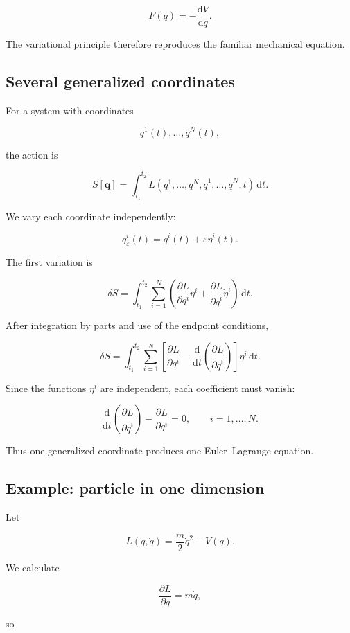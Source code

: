 \[
F(q)
=
-\frac{\mathrm{d}V}{\mathrm{d}q}.
\]

The variational principle therefore reproduces the familiar mechanical equation.

\subsection{Several generalized coordinates}

For a system with coordinates

\[
q^{1}(t),\ldots,q^{N}(t),
\]

the action is

\[
S[\mathbf{q}]
=
\int_{t_{1}}^{t_{2}}
L(q^{1},\ldots,q^{N},
\dot q^{1},\ldots,\dot q^{N},t)
\,\mathrm{d}t.
\]

We vary each coordinate independently:

\[
q^{i}_{\varepsilon}(t)
=
q^{i}(t)+\varepsilon\eta^{i}(t).
\]

The first variation is

\[
\delta S
=
\int_{t_{1}}^{t_{2}}
\sum_{i=1}^{N}
\left(
\frac{\partial L}{\partial q^{i}}\eta^{i}
+
\frac{\partial L}{\partial\dot q^{i}}\dot\eta^{i}
\right)
\,\mathrm{d}t.
\]

After integration by parts and use of the endpoint conditions,

\[
\delta S
=
\int_{t_{1}}^{t_{2}}
\sum_{i=1}^{N}
\left[
\frac{\partial L}{\partial q^{i}}
-
\frac{\mathrm{d}}{\mathrm{d}t}
\left(
\frac{\partial L}{\partial\dot q^{i}}
\right)
\right]
\eta^{i}
\,\mathrm{d}t.
\]

Since the functions \(\eta^{i}\) are independent, each coefficient must vanish:

\[
\boxed{
\frac{\mathrm{d}}{\mathrm{d}t}
\left(
\frac{\partial L}{\partial\dot q^{i}}
\right)
-
\frac{\partial L}{\partial q^{i}}
=0,
\qquad i=1,\ldots,N
}.
\]

Thus one generalized coordinate produces one Euler--Lagrange equation.

\subsection{Example: particle in one dimension}

Let

\[
L(q,\dot q)
=
\frac{m}{2}\dot q^{2}-V(q).
\]

We calculate

\[
\frac{\partial L}{\partial\dot q}
=
m\dot q,
\]

so

